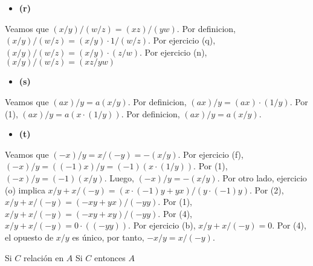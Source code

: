 \documentclass{article}
\begin{document}
\begin{itemize}
\item \bf (r) \rm 
\end{itemize}
Veamos que \(\left(x/y\right)/\left(w/z\right)=\left(xz\right)/\left(yw\right)\). Por definicion, \(\left(x/y\right)/\left(w/z\right)=\left(x/y\right)\cdot 1/\left(w/z\right)\). Por ejercicio (q),  \(\left(x/y\right)/\left(w/z\right)=\left(x/y\right)\cdot \left(z/w\right)\). Por ejercicio (n), \(\left(x/y\right)/\left(w/z\right)=\left(xz/yw\right)\)
\begin{itemize}
\item \bf (s) \rm 
\end{itemize}
Veamos que \(\left(ax\right)/y=a\left(x/y\right)\). Por definicion, \(\left(ax\right)/y=\left(ax\right)\cdot\left(1/y\right)\). Por (1), \(\left(ax\right)/y=a\left(x\cdot\left(1/y\right)\right)\). Por definicion,  \(\left(ax\right)/y=a\left(x/y\right)\).
\begin{itemize}
\item \bf (t) \rm 
\end{itemize}
Veamos que \(\left(-x\right)/y=x/\left(-y\right)=-\left(x/y\right)\). Por ejercicio (f), \(\left(-x\right)/y=\left(\left(-1\right)x\right)/y=(-1)\left(x\cdot\left(1/y\right)\right)\). Por (1),  \(\left(-x\right)/y=(-1)\left(x/y\right)\). Luego,   \(\left(-x\right)/y=-\left(x/y\right)\). Por otro lado, ejercicio (o) implica \(x/y+x/(-y)=\left(x\cdot\left(-1\right)y+yx\right)/\left(y\cdot\left(-1\right)y\right)\). Por (2), \(x/y+x/(-y)=\left(-xy+yx\right)/\left(-yy\right)\). Por (1), \(x/y+x/(-y)=\left(-xy+xy\right)/\left(-yy\right)\). Por (4), \(x/y+x/(-y)=0\cdot\left(\left(-yy\right)\right)\). Por ejercicio (b), \(x/y+x/(-y)=0\). Por (4), el opuesto de \(x/y\) es único, por tanto, \(-x/y=x/(-y)\).


Si \(C\) relación en \(A\)
\newline
Si \(C\) entonces \(A\)
%
%
\end{document}
